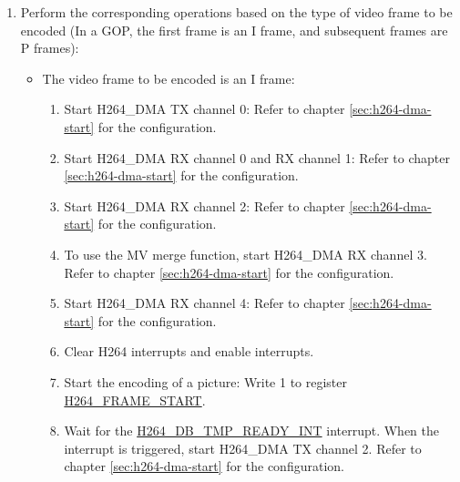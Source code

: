 \documentclass[main\_\_EN.tex]{subfiles}
\begin{document}
\begin{enumerate}
\begin{enumerate}
        \item To use the MB level rate control function, configure its related registers referring to the description in section \ref{sec:h264-rate-ctrl}.
        \item To use the ROI function, configure its related registers referring to the description in chapter \ref{sec:h264-roi}.
        \item To use the MV merge function, configure its related registers referring to the description in section \ref{sec:h264-mv-merge}.
        \item To use the debug function, configure its related registers referring to the description in section \ref{sec:h264-debug-func}.
    \end{enumerate}
    \item\label{item:h264-gop-frame} Perform the corresponding operations based on the type of video frame to be encoded (In a GOP, the first frame is an I frame, and subsequent frames are P frames):
    \begin{itemize}
        \item The video frame to be encoded is an I frame:
        \begin{enumerate}
            \item Start H264\_DMA TX channel 0: Refer to chapter \ref{sec:h264-dma-start} for the configuration.
            \item Start H264\_DMA RX channel 0 and RX channel 1: Refer to chapter \ref{sec:h264-dma-start} for the configuration.
            \item Start H264\_DMA RX channel 2: Refer to chapter \ref{sec:h264-dma-start} for the configuration.
            \item To use the MV merge function, start H264\_DMA RX channel 3. Refer to chapter \ref{sec:h264-dma-start} for the configuration.
            \item Start H264\_DMA RX channel 4: Refer to chapter \ref{sec:h264-dma-start} for the configuration.
            \item Clear H264 interrupts and enable interrupts.
            \item Start the encoding of a picture: Write 1 to register \hyperref[fielddesc:H264FRAMESTART]{H264\_FRAME\_START}.
            \item Wait for the \hyperref[int:H264DBTMPREADYINT]{H264\_DB\_TMP\_READY\_INT} interrupt. When the interrupt is triggered, start H264\_DMA TX channel 2. Refer to chapter \ref{sec:h264-dma-start} for the configuration.

\end{enumerate}
\end{itemize}
\end{enumerate}
\end{document}
